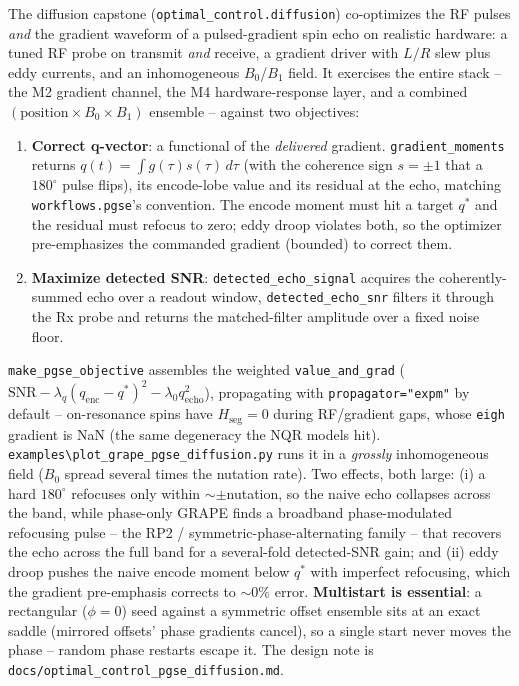 \documentclass[11pt,oneside]{report}
\newcommand{\code}[1]{\texttt{#1}}
\begin{document}
The diffusion capstone (\code{optimal\_control.diffusion}) co-optimizes the RF
pulses \emph{and} the gradient waveform of a pulsed-gradient spin echo on
realistic hardware: a tuned RF probe on transmit \emph{and} receive, a gradient
driver with \(L/R\) slew plus eddy currents, and an inhomogeneous \(B_0\)/\(B_1\)
field. It exercises the entire stack -- the M2 gradient channel, the M4
hardware-response layer, and a combined \((\text{position}\times B_0\times B_1)\)
ensemble -- against two objectives:
\begin{enumerate}
  \item \textbf{Correct q-vector}: a functional of the \emph{delivered} gradient.
  \code{gradient\_moments} returns \(q(t)=\int g(\tau)s(\tau)\,d\tau\) (with the
  coherence sign \(s=\pm1\) that a \(180^\circ\) pulse flips), its encode-lobe
  value and its residual at the echo, matching \code{workflows.pgse}'s
  convention. The encode moment must hit a target \(q^\ast\) and the residual
  must refocus to zero; eddy droop violates both, so the optimizer
  pre-emphasizes the commanded gradient (bounded) to correct them.
  \item \textbf{Maximize detected SNR}: \code{detected\_echo\_signal} acquires the
  coherently-summed echo over a readout window, \code{detected\_echo\_snr}
  filters it through the Rx probe and returns the matched-filter amplitude over
  a fixed noise floor.
\end{enumerate}
\code{make\_pgse\_objective} assembles the weighted \code{value\_and\_grad}
(\(\text{SNR} - \lambda_q(q_\text{enc}-q^\ast)^2 - \lambda_0 q_\text{echo}^2\)),
propagating with \code{propagator="expm"} by default -- on-resonance spins have
\(H_\text{seg}=0\) during RF/gradient gaps, whose \code{eigh} gradient is NaN
(the same degeneracy the NQR models hit).
\code{examples\textbackslash plot\_grape\_pgse\_diffusion.py} runs it in a
\emph{grossly} inhomogeneous field (\(B_0\) spread several times the nutation
rate). Two effects, both large: (i) a hard \(180^\circ\) refocuses only within
\(\sim\pm\)nutation, so the naive echo collapses across the band, while phase-only
GRAPE finds a broadband phase-modulated refocusing pulse -- the RP2 /
symmetric-phase-alternating family -- that recovers the echo across the full
band for a several-fold detected-SNR gain; and (ii) eddy droop pushes the naive
encode moment below \(q^\ast\) with imperfect refocusing, which the gradient
pre-emphasis corrects to \(\sim 0\%\) error. \textbf{Multistart is essential}: a
rectangular (\(\phi=0\)) seed against a symmetric offset ensemble sits at an
exact saddle (mirrored offsets' phase gradients cancel), so a single start never
moves the phase -- random phase restarts escape it. The design note is
\code{docs/optimal\_control\_pgse\_diffusion.md}.
\end{document}
